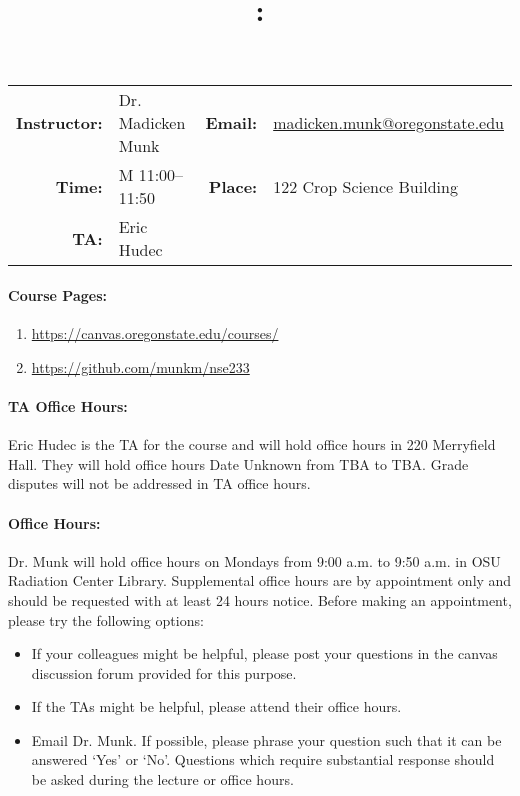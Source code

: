 \documentclass[11pt, a4paper]{article}
\title{\CourseNumber: \CourseTitle\\}
\author{\CourseUniversity}
\date{\CourseSemester \CourseYear}
\makeatletter
\newcommand{\CourseInstructor}{Dr. Madicken Munk\xspace}%
\newcommand{\CourseDays}{M\xspace}%
\newcommand{\CourseStart}{11:00\xspace}%
\newcommand{\CourseEnd}{11:50\xspace}%
\newcommand{\CourseInstructorEmail}{madicken.munk@oregonstate.edu}
\newcommand{\CourseRoom}{122\xspace}%
\newcommand{\CourseBuilding}{Crop Science Building\xspace}%
\newcommand{\TeachingAssistant}{Eric Hudec\xspace}%
\newcommand{\TAOfficeHourDays}{Date Unknown \xspace}%
\newcommand{\TAOfficeHourStart}{TBA\xspace}%
\newcommand{\TAOfficeHourEnd}{TBA\xspace}%
\newcommand{\TAOfficeHourPlace}{220 Merryfield Hall\xspace}
\newcommand{\MunkOfficeHourDays}{Mondays\xspace}%
\newcommand{\MunkOfficeHourStart}{9:00 a.m.\xspace}%
\newcommand{\MunkOfficeHourEnd}{9:50 a.m.\xspace}%
\newcommand{\MunkOfficeHourPlace}{OSU Radiation Center Library\xspace}
\makeatother
\begin{document}
\maketitle
\renewcommand{\arraystretch}{1.5}
\begin{center}
\begin{table}[h]
\begin{tabularx}{\textwidth}{rXrX}
\hline
\textbf{Instructor:} & \CourseInstructor & \textbf{Email:} & \href{mailto:\CourseInstructorEmail}{\CourseInstructorEmail} \\
\textbf{Time:} & \CourseDays \CourseStart -- \CourseEnd & \textbf{Place:} & \CourseRoom \CourseBuilding \\
\textbf{TA:} & \TeachingAssistant & & \\
\hline
\end{tabularx}
\end{table}
\end{center}

\paragraph{Course Pages:}
\begin{enumerate}
        \item \url{https://canvas.oregonstate.edu/courses/}
        \item \url{https://github.com/munkm/nse233}
\end{enumerate}

\paragraph{TA Office Hours:} \TeachingAssistant is the TA for the course and will hold
office hours in \TAOfficeHourPlace.
They will hold office hours \TAOfficeHourDays from
\TAOfficeHourStart to \TAOfficeHourEnd.
Grade disputes will not be addressed in TA office hours.

\paragraph{Office Hours:} Dr. Munk  will hold office hours 
on
\MunkOfficeHourDays from \MunkOfficeHourStart to \MunkOfficeHourEnd in
\MunkOfficeHourPlace. Supplemental office hours are by appointment only
and should be requested with at least 24 hours notice.
Before making an appointment, please try the following options:
\begin{itemize}
\item If your colleagues might be helpful, please post your questions in the
        canvas discussion forum provided for this purpose.
\item If the TAs might be helpful, please attend their office hours.
\item Email Dr. Munk. If possible, please phrase your question such that it
        can be answered `Yes' or `No'.  Questions which require substantial
        response should be asked during the lecture or office hours.
\end{itemize}
\end{document}
